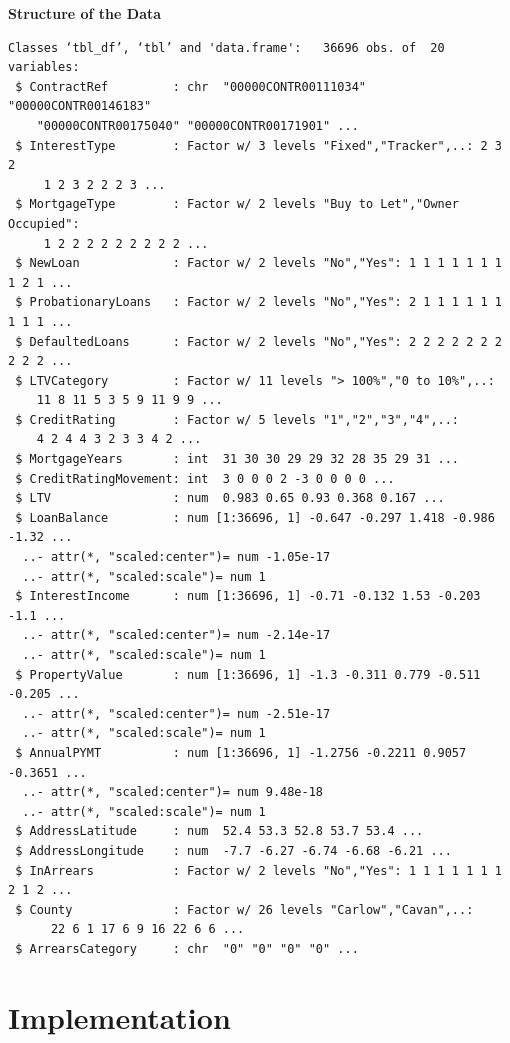 \textbf{Structure of the Data}
\begin{verbatim}
Classes ‘tbl_df’, ‘tbl’ and 'data.frame':	36696 obs. of  20 variables:
 $ ContractRef         : chr  "00000CONTR00111034" "00000CONTR00146183"
    "00000CONTR00175040" "00000CONTR00171901" ...
 $ InterestType        : Factor w/ 3 levels "Fixed","Tracker",..: 2 3 2
     1 2 3 2 2 2 3 ...
 $ MortgageType        : Factor w/ 2 levels "Buy to Let","Owner Occupied":
     1 2 2 2 2 2 2 2 2 2 ...
 $ NewLoan             : Factor w/ 2 levels "No","Yes": 1 1 1 1 1 1 1 1 2 1 ...
 $ ProbationaryLoans   : Factor w/ 2 levels "No","Yes": 2 1 1 1 1 1 1 1 1 1 ...
 $ DefaultedLoans      : Factor w/ 2 levels "No","Yes": 2 2 2 2 2 2 2 2 2 2 ...
 $ LTVCategory         : Factor w/ 11 levels "> 100%","0 to 10%",..:
    11 8 11 5 3 5 9 11 9 9 ...
 $ CreditRating        : Factor w/ 5 levels "1","2","3","4",..:
    4 2 4 4 3 2 3 3 4 2 ...
 $ MortgageYears       : int  31 30 30 29 29 32 28 35 29 31 ...
 $ CreditRatingMovement: int  3 0 0 0 2 -3 0 0 0 0 ...
 $ LTV                 : num  0.983 0.65 0.93 0.368 0.167 ...
 $ LoanBalance         : num [1:36696, 1] -0.647 -0.297 1.418 -0.986 -1.32 ...
  ..- attr(*, "scaled:center")= num -1.05e-17
  ..- attr(*, "scaled:scale")= num 1
 $ InterestIncome      : num [1:36696, 1] -0.71 -0.132 1.53 -0.203 -1.1 ...
  ..- attr(*, "scaled:center")= num -2.14e-17
  ..- attr(*, "scaled:scale")= num 1
 $ PropertyValue       : num [1:36696, 1] -1.3 -0.311 0.779 -0.511 -0.205 ...
  ..- attr(*, "scaled:center")= num -2.51e-17
  ..- attr(*, "scaled:scale")= num 1
 $ AnnualPYMT          : num [1:36696, 1] -1.2756 -0.2211 0.9057 -0.3651 ...
  ..- attr(*, "scaled:center")= num 9.48e-18
  ..- attr(*, "scaled:scale")= num 1
 $ AddressLatitude     : num  52.4 53.3 52.8 53.7 53.4 ...
 $ AddressLongitude    : num  -7.7 -6.27 -6.74 -6.68 -6.21 ...
 $ InArrears           : Factor w/ 2 levels "No","Yes": 1 1 1 1 1 1 1 2 1 2 ...
 $ County              : Factor w/ 26 levels "Carlow","Cavan",..: 
      22 6 1 17 6 9 16 22 6 6 ...
 $ ArrearsCategory     : chr  "0" "0" "0" "0" ...
\end{verbatim}

\section{Implementation}\label{}

